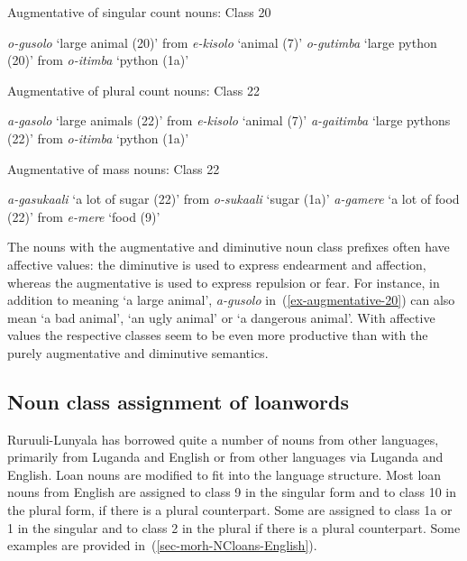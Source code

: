 \ea Augmentative of singular count nouns: Class 20 \label{ex-augmentative-20}
\begin{xlist}	
	\ex \textit{o-gusolo} `large animal (20)’ from \textit{e-kisolo} `animal (7)’
	\ex \textit{o-gutimba} `large python (20)’ from \textit{o-itimba} `python (1a)’
\end{xlist}	
\z

\ea Augmentative of plural count nouns: Class 22 \label{ex-augmentative-22}
\begin{xlist}	
\ex \textit{a-gasolo} `large animals (22)’ from \textit{e-kisolo} `animal (7)’
\ex \textit{a-gaitimba} `large pythons (22)’ from \textit{o-itimba} `python (1a)’
\end{xlist}	
\z

\ea Augmentative of mass nouns: Class 22 \label{ex-augmentative-mass-22}
\begin{xlist}	
	\ex \textit{a-gasukaali} ‘a lot of sugar (22)’ from \textit{o-sukaali} ‘sugar (1a)’
	\ex \textit{a-gamere} ‘a lot of food (22)’ from \textit{e-mere} ‘food (9)’

\end{xlist}	
\z

The nouns with the augmentative and diminutive noun class prefixes often have affective values: the diminutive is used to express endearment and affection, whereas the augmentative is used to express repulsion or fear. 
For instance,  in addition to meaning `a large animal', \textit{a-gusolo} in~(\ref{ex-augmentative-20}) can also mean `a bad animal', `an ugly animal' or `a dangerous animal'. 
With affective values the respective classes seem to be even more productive than with the purely  augmentative and diminutive semantics.

\subsection{Noun class assignment of loanwords}\label{sec-morh-NCloans}

Ruruuli-Lunyala has borrowed quite a number of nouns from other languages, primarily from Luganda and English or from other languages via Luganda and English. 
Loan nouns are modified to fit into the language structure. 
Most loan nouns from English are assigned to class 9 in the singular form and to class 10 in the plural form, if there is a plural counterpart. Some are assigned to class 1a or 1 in the singular and to class 2 in the plural if there is a plural counterpart. 
Some examples are provided in~(\ref{sec-morh-NCloans-English}).

